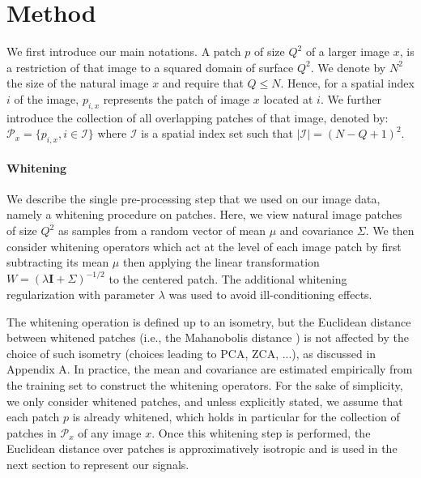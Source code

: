 \documentclass{article} %
\begin{document}
\label{method}

\section{Method}%
We first introduce our main notations. A patch $p$ of size $Q^2$ of a larger image $x$, is a  restriction of that image to a squared domain of surface $Q^2$. We denote by $N^2$ the size of the natural image $x$ and require that $Q\leq N$. Hence, for a spatial index $i$ of the image,  $p_{i,x}$ represents the patch of image $x$ located at $i$.
We further introduce the collection of all overlapping patches of that image, denoted by: $\mathcal{P}_x=\{p_{i,x},i\in\mathcal{I}\}$ where $\mathcal{I}$ is a spatial index set such that $|\mathcal{I}|=(N-Q+1)
^2$. 
\paragraph{Whitening} We describe the single pre-processing step that we used on our image data, namely a whitening procedure on patches. %
Here, we view natural image patches of size $Q^2$ as samples from a random vector of mean $\mu$ and covariance   $\Sigma$. 
We then consider  whitening operators which act at the level of each image patch by first subtracting its mean $\mu$ then applying the linear transformation $W=(\lambda \mathbf{I}+\Sigma
)^{-1/2}$ to the centered patch. The additional whitening regularization with parameter $\lambda$ was used to avoid ill-conditioning effects.

The whitening operation is defined up to an isometry, but the Euclidean distance between whitened patches (i.e., the Mahanobolis distance \citep{chandra1936generalised}) is not affected by the choice of such isometry (choices leading to PCA, ZCA, ...), as discussed in Appendix A.
In practice,  the mean and covariance are estimated empirically from the training set to construct the whitening operators. For the sake of simplicity, we  only  consider whitened patches, and unless explicitly stated, we assume that each patch $p$ is already whitened, which holds in particular for the collection of patches in $\mathcal{P}_x$ of any image $x$. 
Once this whitening step is performed, the Euclidean distance over patches is approximatively isotropic and is used in the next section to represent our signals.
\end{document}
